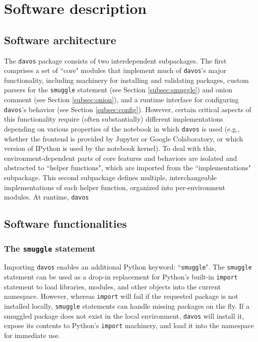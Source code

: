 \documentclass[preprint,12pt, a4paper]{elsarticle}
\newcommand{\comment}[1]{}
\begin{document}
\section{Software description}


\subsection{Software architecture}
The \texttt{davos} package consists of two interdependent subpackages. The first comprises a set of ``core" modules that implement\comment{provide?} much of \texttt{davos}'s major functionality, including machinery for installing and validating packages, custom parsers for the \texttt{smuggle} statement (see Section \ref{subsec:smuggle}) and onion comment (see Section \ref{subsec:onion}), and a runtime interface for configuring \texttt{davos}'s behavior (see Section \ref{subsec:config}). However, certain critical\comment{other important} aspects of this functionality require (often substantially) different implementations depending on various properties of the notebook in which \texttt{davos} is used (e.g., whether the frontend is provided by Jupyter or Google Colaboratory, or which version of IPython \cite{PereGran07} is used by the notebook kernel). To deal with this, environment-dependent parts of core features and behaviors are isolated and abstracted to ``helper functions", which are imported from the ``implementations" subpackage. This second subpackage defines multiple, interchangeable implementations of each helper function, organized into per-environment modules. At runtime, \texttt{davos}



\subsection{Software functionalities}%

\subsubsection{The \texttt{smuggle} statement}
Importing \texttt{davos}\comment{in a Jupyter notebook} enables an additional Python keyword: ``\texttt{smuggle}".
The \texttt{smuggle} statement can be used as a drop-in replacement for Python's built-in \texttt{import} statement to load libraries, modules, and other objects into the current namespace.
However, whereas \texttt{import} will fail if the requested package is not installed locally, \texttt{smuggle} statements can handle missing packages on the fly.
If a smuggled package does not exist in the local environment, \texttt{davos} will install it, expose its contents to Python's \texttt{import} machinery, and load it into the namespace for immediate use.
\end{document}
